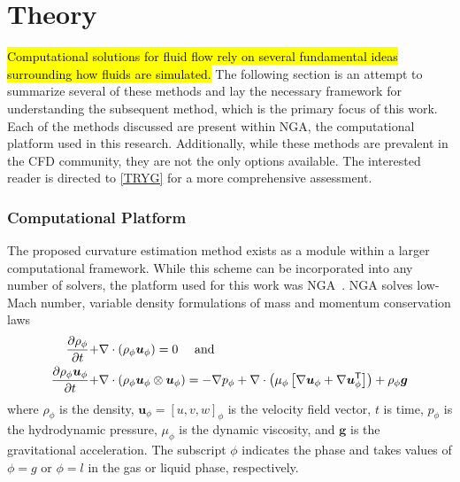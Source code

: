 \chapter{Theory} \label{CH:theory}
\hl{Computational solutions for fluid flow rely on several fundamental ideas surrounding how fluids are simulated.} The following section is an attempt to summarize several of these methods and lay the necessary framework for understanding the subsequent method, which is the primary focus of this work. Each of the methods discussed are present within NGA, the computational platform used in this research. Additionally, while these methods are prevalent in the CFD community, they are not the only options available. The interested reader is directed to \ref{TRYG} for a more comprehensive assessment.   


\subsection{Computational Platform}
 The proposed curvature estimation method exists as a module within a larger computational framework. While this scheme can be incorporated into any number of solvers, the platform used for this work was NGA~\cite{NGA1,NGA2}.  NGA solves low-Mach number, variable density formulations of mass and momentum conservation laws
\begin{align}
\frac{\partial \rho_\phi}{\partial t} +& \nabla \cdot \left(\rho_\phi\mbox{\boldmath{$u$}}_\phi\right) = 0\mbox{ \quad and}\\
\frac{\partial \rho_\phi \mbox{\boldmath{$u$}}_\phi}{\partial t} +& \nabla \cdot \left(\rho_\phi\mbox{\boldmath{$u$}}_\phi\otimes\mbox{\boldmath{$u$}}_\phi\right) = -\nabla p_\phi + \nabla\cdot\left(\mu_\phi\left[\nabla\mbox{\boldmath{$u$}}_\phi+\nabla\mbox{\boldmath{$u$}}_\phi^\mathsf{T}\right]\right)+\rho_\phi\mbox{\boldmath{$g$}}
\end{align}
where
$\rho_\phi$ is the density,
$\bm{u}_\phi=[u,v,w]_\phi$ is the velocity field vector,
$t$ is time,
$p_\phi$ is the hydrodynamic pressure,
$\mu_\phi$ is the dynamic viscosity, and
$\bm{g}$ is the gravitational acceleration.
The subscript
$\phi$ indicates the phase and takes values of $\phi=g$ or
$\phi=l$ in the gas or liquid phase, respectively.

